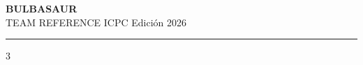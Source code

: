 \documentclass[9pt,a4paper,landscape]{extarticle}
\begin{document}
\thispagestyle{plain}
\begin{center}
  {\sffamily\bfseries\fontsize{27}{29}\selectfont BULBASAUR}\\[1pt]
  {\sffamily\large TEAM REFERENCE \textperiodcentered{} ICPC \textperiodcentered{} Edición 2026}\\[2pt]
  \rule{\linewidth}{1.1pt}
\end{center}



\vspace{1mm}
\begin{multicols}{3}




\end{multicols}
\end{document}
